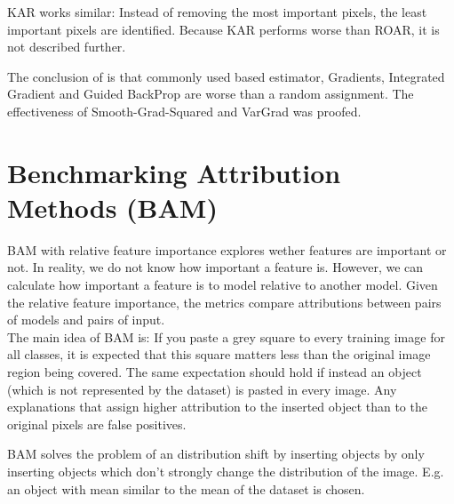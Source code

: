 KAR works similar: Instead of removing the most important pixels, the least important pixels are identified. Because KAR performs worse than ROAR, it is not described further.

The conclusion of \cite{hooker2019benchmark} is that commonly used based estimator, Gradients, Integrated Gradient and Guided BackProp are worse than a random assignment. The effectiveness of Smooth-Grad-Squared and VarGrad was proofed. 


\section{Benchmarking Attribution Methods (BAM) \cite{yang2019benchmarking}}

BAM with relative feature importance explores wether features are important or not. In reality, we do not know how important a feature is. However, we can calculate how important a feature is to model relative to another model. Given the relative feature importance, the metrics compare attributions between pairs of models and pairs of input.\\

The main idea of BAM is: If you paste a grey square to every training image for all classes, it is expected that this square matters less than the original image region being covered. The same expectation should hold if instead an object (which is not represented by the dataset) is pasted in every image. Any explanations that assign higher attribution to the inserted object than to the original pixels are false positives.

BAM solves the problem of an distribution shift by inserting objects by only inserting objects which don't strongly change the distribution of the image. E.g. an object with mean similar to the mean of the dataset is chosen.


